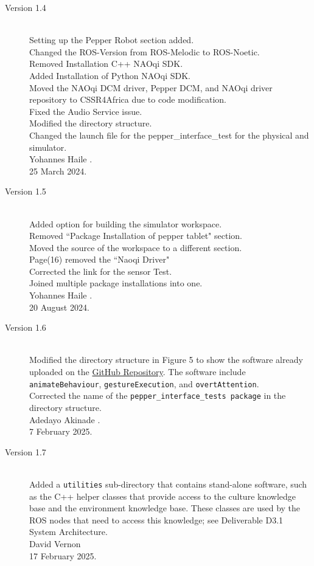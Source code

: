 \documentclass{CSSRforAfrica}
\begin{document}
{\begin{description}
			\item [Version 1.4]~\\
			Setting up the Pepper Robot section added.\\
			Changed the ROS-Version from ROS-Melodic to ROS-Noetic.\\
			Removed Installation C++ NAOqi SDK.\\
			Added Installation of Python NAOqi SDK.\\
			Moved the NAOqi DCM driver, Pepper DCM, and NAOqi driver repository to CSSR4Africa due to code modification.\\
			Fixed the Audio Service issue.\\
			Modified the directory structure.\\
			Changed the launch file for the pepper\_interface\_test for the physical and simulator.\\
			Yohannes Haile .\\
			25 March 2024.
			
			\newpage
			
			\item [Version 1.5]~\\
			Added option for building the simulator workspace.\\
			Removed ``Package Installation of pepper tablet" section.\\
			Moved the source of the workspace to a different section.\\
			Page(16) removed the ``Naoqi Driver" \\
			Corrected the link for the sensor Test. \\
			Joined multiple package installations into one.\\
			Yohannes Haile .\\
			20 August 2024.
			
			\item [Version 1.6]~\\
			Modified the directory structure in Figure 5 to show the software already uploaded on the \href{https://github.com/cssr4africa/cssr4africa} {GitHub Repository}.
			The software include \texttt{animateBehaviour}, \texttt{gestureExecution}, and \texttt{overtAttention}.\\
			Corrected the name of the \texttt{pepper\_interface\_tests package} in the directory structure.\\
			Adedayo Akinade .\\
			7 February 2025.
			
			\item [Version 1.7]~\\
			Added a {\small \tt utilities} sub-directory that contains stand-alone software, such as the C++ helper classes that provide access to the culture knowledge base and the environment knowledge base. These classes are used by the ROS nodes that need to access this knowledge; see Deliverable D3.1 System Architecture.\\
			David Vernon \\       
			17 February 2025.
			

\end{description}}
\end{document}
